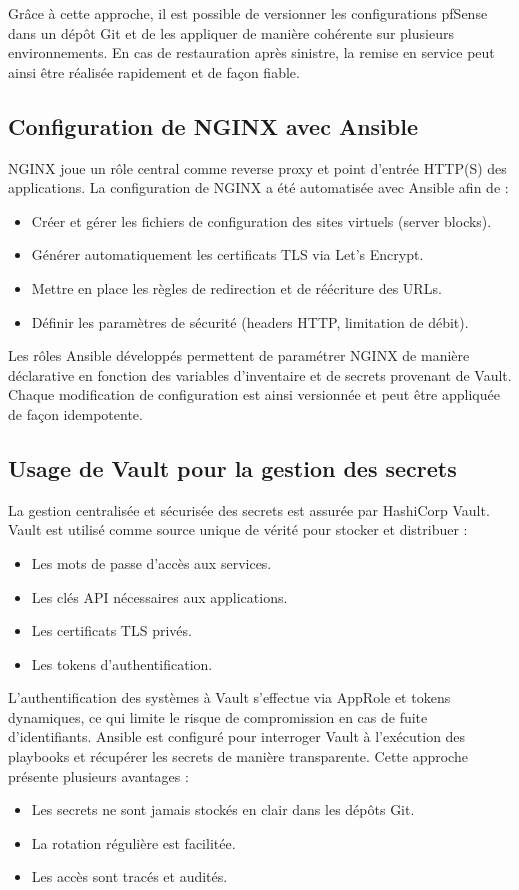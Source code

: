 Grâce à cette approche, il est possible de versionner les configurations pfSense dans un dépôt Git et de les appliquer de manière cohérente sur plusieurs environnements.
En cas de restauration après sinistre, la remise en service peut ainsi être réalisée rapidement et de façon fiable.

\subsection{Configuration de NGINX avec Ansible}

NGINX joue un rôle central comme reverse proxy et point d’entrée HTTP(S) des applications.
La configuration de NGINX a été automatisée avec Ansible afin de :
\begin{itemize}
	\item Créer et gérer les fichiers de configuration des sites virtuels (server blocks).
	\item Générer automatiquement les certificats TLS via Let’s Encrypt.
	\item Mettre en place les règles de redirection et de réécriture des URLs.
	\item Définir les paramètres de sécurité (headers HTTP, limitation de débit).
\end{itemize}

Les rôles Ansible développés permettent de paramétrer NGINX de manière déclarative en fonction des variables d’inventaire et de secrets provenant de Vault.
Chaque modification de configuration est ainsi versionnée et peut être appliquée de façon idempotente.

\subsection{Usage de Vault pour la gestion des secrets}

La gestion centralisée et sécurisée des secrets est assurée par HashiCorp Vault.
Vault est utilisé comme source unique de vérité pour stocker et distribuer :
\begin{itemize}
	\item Les mots de passe d’accès aux services.
	\item Les clés API nécessaires aux applications.
	\item Les certificats TLS privés.
	\item Les tokens d’authentification.
\end{itemize}

L’authentification des systèmes à Vault s’effectue via AppRole et tokens dynamiques, ce qui limite le risque de compromission en cas de fuite d’identifiants.
Ansible est configuré pour interroger Vault à l’exécution des playbooks et récupérer les secrets de manière transparente.
Cette approche présente plusieurs avantages :
\begin{itemize}
	\item Les secrets ne sont jamais stockés en clair dans les dépôts Git.
	\item La rotation régulière est facilitée.
	\item Les accès sont tracés et audités.
\end{itemize}

